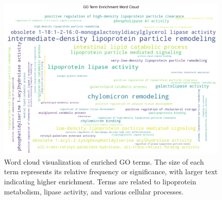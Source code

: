 \begin{figure}[h!]
    \centering
    \includegraphics[width=0.8 \textwidth]{images/go_enrichment_wordcloud.png}
    \caption{Word cloud visualization of enriched GO terms. The size of each term represents its relative frequency or significance, with larger text indicating higher enrichment. Terms are related to lipoprotein metabolism, lipase activity, and various cellular processes.}
    \label{fig:go-wordcloud}
\end{figure}